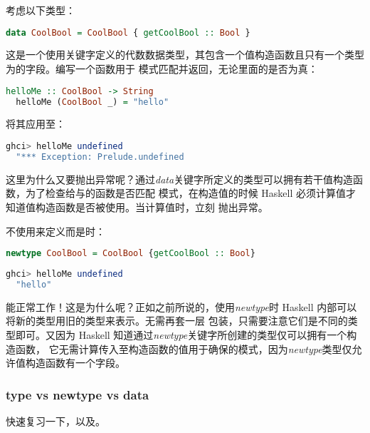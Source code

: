 \documentclass[./main.tex]{subfiles}
\begin{document}
考虑以下类型：

\begin{lstlisting}[language=Haskell]
  data CoolBool = CoolBool { getCoolBool :: Bool }
\end{lstlisting}

这是一个使用关键字定义的代数数据类型，其包含一个值构造函数且只有一个类型为的字段。编写一个函数用于
模式匹配并返回，无论里面的是否为真：

\begin{lstlisting}[language=Haskell]
  helloMe :: CoolBool -> String
  helloMe (CoolBool _) = "hello"
\end{lstlisting}

将其应用至：

\begin{lstlisting}[language=Haskell]
  ghci> helloMe undefined
  "*** Exception: Prelude.undefined
\end{lstlisting}

这里为什么又要抛出异常呢？通过\textit{data}关键字所定义的类型可以拥有若干值构造函数，为了检查给与的函数是否匹配
模式，在构造值的时候 Haskell 必须计算值才知道值构造函数是否被使用。当计算值时，立刻
抛出异常。

不使用来定义而是时：

\begin{lstlisting}[language=Haskell]
  newtype CoolBool = CoolBool {getCoolBool :: Bool}
\end{lstlisting}

\begin{lstlisting}[language=Haskell]
  ghci> helloMe undefined
  "hello"
\end{lstlisting}

能正常工作！这是为什么呢？正如之前所说的，使用\textit{newtype}时 Haskell 内部可以将新的类型用旧的类型来表示。无需再套一层
包装，只需要注意它们是不同的类型即可。又因为 Haskell 知道通过\textit{newtype}关键字所创建的类型仅可以拥有一个构造函数，
它无需计算传入至构造函数的值用于确保的模式，因为\textit{newtype}类型仅允许值构造函数有一个字段。

\subsubsection*{type vs newtype vs data}

快速复习一下，以及。
\end{document}

